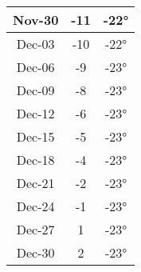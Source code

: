 \begin{footnotesize}
\begin{minipage}{0.5\textwidth}
\begin{tabular}{c | c | c}
Nov-30 & -11 & -22°\\\hline
Dec-03 & -10 & -22°\\\hline
Dec-06 & -9 & -23°\\\hline
Dec-09 & -8 & -23°\\\hline
Dec-12 & -6 & -23°\\\hline
Dec-15 & -5 & -23°\\\hline
Dec-18 & -4 & -23°\\\hline
Dec-21 & -2 & -23°\\\hline
Dec-24 & -1 & -23°\\\hline
Dec-27 & 1 & -23°\\\hline
Dec-30 & 2 & -23°\\\hline
\end{tabular}\end{minipage}
\end{footnotesize}

